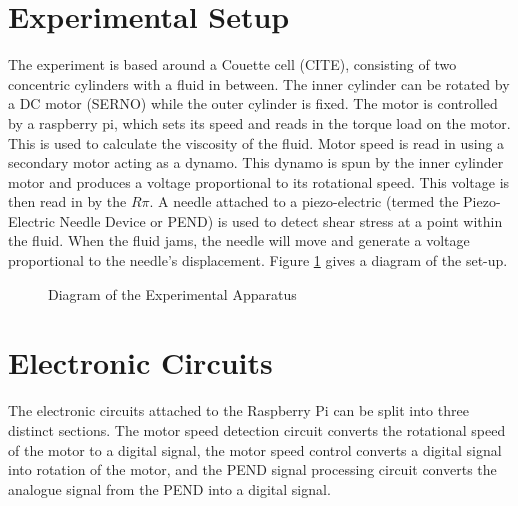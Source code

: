 \documentclass[twoside,a4]{report}
\def\rpi{\(R\pi\)}
\begin{document}
	\section{Experimental Setup} %
	The experiment is based around a Couette cell (CITE), consisting of two concentric cylinders with a fluid in between. The inner cylinder can be rotated by a DC motor (SERNO) while the outer cylinder is fixed. The motor is controlled by a raspberry pi, which sets its speed and reads in the torque load on the motor. This is used to calculate the viscosity of the fluid. 
	Motor speed is read in using a secondary motor acting as a dynamo. This dynamo is spun by the inner cylinder motor and produces a voltage proportional to its rotational speed. This voltage is then read in by the \rpi.
	A needle attached to a piezo-electric (termed the Piezo-Electric Needle Device or PEND) is used to detect shear stress at a point within the fluid. When the fluid jams, the needle will move and generate a voltage proportional to the needle's displacement. Figure \ref{expdia} gives a diagram of the set-up.\newline
	\begin{figure}[!htb]
	\centering
	\caption{Diagram of the Experimental Apparatus}
	\label{expdia}
	\end{figure}
	
	\section{Electronic Circuits} %
	The electronic circuits attached to the Raspberry Pi can be split into three distinct sections. The motor speed detection circuit converts the rotational speed of the motor to a digital signal, the motor speed control converts a digital signal into rotation of the motor, and the PEND signal processing circuit converts the analogue signal from the PEND into a digital signal.
\end{document}
